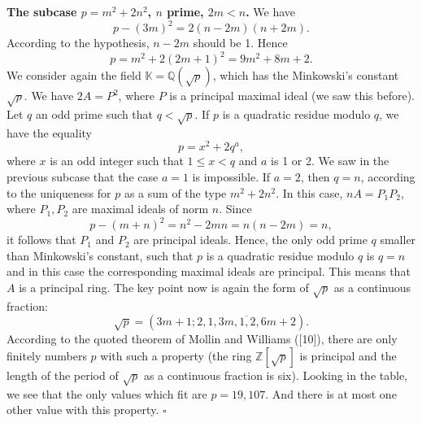 \documentclass[12pt]{article}
\newenvironment{proof}{{\it Proof.}}{\hfill $ \square $ \vskip 4mm}
\begin{document}
{\begin{proof}
{\bf The subcase $p=m^2+2n^2$, $n$ prime, $2m<n$.} We have
$$p-(3m)^2=2(n-2m)(n+2m).$$ According to the hypothesis, $n-2m$ should be 1. Hence 
$$p=m^2+2(2m+1)^2=9m^2+8m+2.$$
We consider again the field $\mathbb{K}=\mathbb{Q}(\sqrt {p})$, which has the Minkowski's constant $\sqrt p$.
We have $2A=P^2$, where $P$ is a principal maximal ideal (we saw this before). Let $q$ an odd prime such that $q< \sqrt p$. If $p$ is a quadratic residue modulo $q$, we have the equality
$$p=x^2+2q^a,$$ where $x$ is an odd integer such that $1\leq x<q$ and $a$ is 1 or 2. We saw in the previous subcase that the case $a=1$ is impossible.
 If $a=2$, then $q=n$, according to the uniqueness for $p$ as a sum of the type $m^2+2n^2$. In this case, $nA=P_1P_2$, where $P_1,P_2$ are maximal ideals of norm $n$. Since 
$$p-(m+n)^2=n^2-2mn=n(n-2m)=n,$$ it follows that $P_1$ and $P_2$ are principal ideals.
Hence, the only odd prime $q$ smaller than Minkowski's constant, such that $p$ is a quadratic residue modulo $q$ is $q=n$ and in this case the corresponding maximal ideals are principal. This means that $A$ is a principal ring. The key point now is again  the form of $\sqrt p$ as a continuous fraction:
$$\sqrt p = (3m+1; \overline {2,1,3m,1,2,6m+2}).$$
According to the quoted theorem of Mollin and Williams ([10]), there are only finitely numbers $p$ with such a property (the ring $\mathbb{Z}[\sqrt p]$ is principal and the length of the period of $\sqrt p$ as a continuous fraction is six). Looking in the table, we see that the only values which fit are $p=19,107$. And there is at most one other value with this property. 
\end{proof}




}
\end{document}
